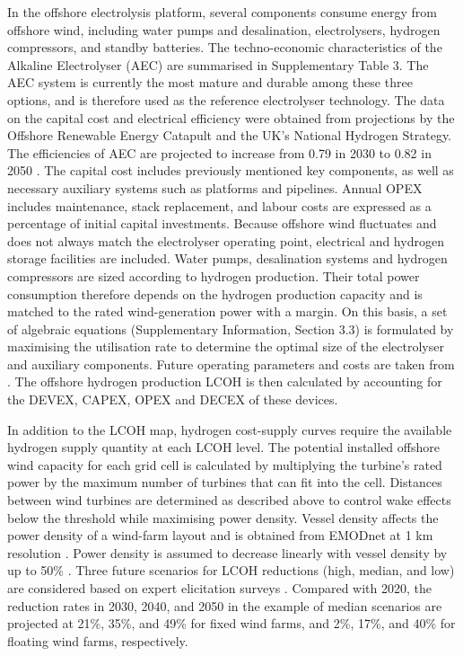 \documentclass[pdflatex,sn-mathphys,Numbered]{sn-jnl}%
\begin{document}
In the offshore electrolysis platform, several components consume energy from offshore wind, including water pumps and desalination, electrolysers, hydrogen compressors, and standby batteries.
The techno-economic characteristics of the Alkaline Electrolyser (AEC) are summarised in Supplementary Table 3. The AEC system is currently the most mature and durable among these three options, and is therefore used as the reference electrolyser technology. The data on the capital cost and electrical efficiency were obtained from projections by the Offshore Renewable Energy Catapult and the UK's National Hydrogen Strategy. The efficiencies of AEC are projected to increase from 0.79 in 2030 to 0.82 in 2050 \cite{HydrogenAnalyticalAnnex}.
The capital cost includes previously mentioned key components, as well as necessary auxiliary systems such as platforms and pipelines. Annual OPEX includes maintenance, stack replacement, and labour costs are expressed as a percentage of initial capital investments.
Because offshore wind fluctuates and does not always match the electrolyser operating point, electrical and hydrogen storage facilities are included. Water pumps, desalination systems and hydrogen compressors are sized according to hydrogen production. Their total power consumption therefore depends on the hydrogen production capacity and is matched to the rated wind-generation power with a margin. On this basis, a set of algebraic equations (Supplementary Information, Section 3.3) is formulated by maximising the utilisation rate to determine the optimal size of the electrolyser and auxiliary components. Future operating parameters and costs are taken from \cite{OffshoreWindandHydrogen}. The offshore hydrogen production LCOH is then calculated by accounting for the DEVEX, CAPEX, OPEX and DECEX of these devices.

In addition to the LCOH map, hydrogen cost-supply curves require the available hydrogen supply quantity at each LCOH level. The potential installed
offshore wind capacity for each grid cell is calculated by multiplying the turbine's rated power by the maximum number of turbines that can fit into the cell. Distances between wind turbines are determined as described above to control wake effects below the threshold while maximising power density. Vessel density affects the power density of a wind-farm layout and is obtained from EMODnet at 1 km resolution \cite{RouteDensityMap}. Power density is assumed to decrease linearly with vessel density by up to 50\% \cite{guo2023grid}.
Three future scenarios for LCOH reductions (high, median, and low) are considered based on expert elicitation surveys \cite{wiser2021expert}. Compared with 2020, the reduction rates in 2030, 2040, and 2050 in the example of median scenarios are projected at 21\%, 35\%, and 49\% for fixed wind farms, and 2\%, 17\%, and 40\% for floating wind farms, respectively.
\end{document}
